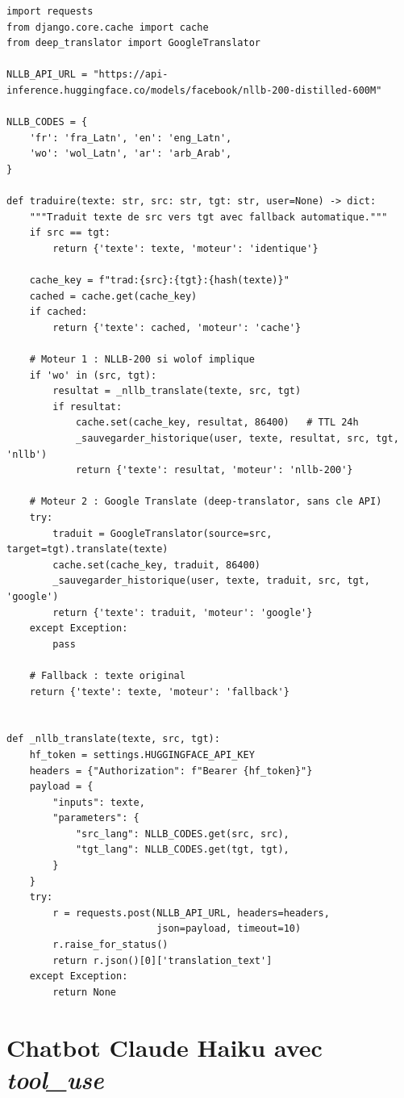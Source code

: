 \documentclass[12pt,a4paper,twoside]{report}
\begin{document}
\begin{lstlisting}[style=pythonstyle, caption={Service de traduction (\texttt{apps/traduction/services.py} --- extrait)}]
import requests
from django.core.cache import cache
from deep_translator import GoogleTranslator

NLLB_API_URL = "https://api-inference.huggingface.co/models/facebook/nllb-200-distilled-600M"

NLLB_CODES = {
    'fr': 'fra_Latn', 'en': 'eng_Latn',
    'wo': 'wol_Latn', 'ar': 'arb_Arab',
}

def traduire(texte: str, src: str, tgt: str, user=None) -> dict:
    """Traduit texte de src vers tgt avec fallback automatique."""
    if src == tgt:
        return {'texte': texte, 'moteur': 'identique'}

    cache_key = f"trad:{src}:{tgt}:{hash(texte)}"
    cached = cache.get(cache_key)
    if cached:
        return {'texte': cached, 'moteur': 'cache'}

    # Moteur 1 : NLLB-200 si wolof implique
    if 'wo' in (src, tgt):
        resultat = _nllb_translate(texte, src, tgt)
        if resultat:
            cache.set(cache_key, resultat, 86400)   # TTL 24h
            _sauvegarder_historique(user, texte, resultat, src, tgt, 'nllb')
            return {'texte': resultat, 'moteur': 'nllb-200'}

    # Moteur 2 : Google Translate (deep-translator, sans cle API)
    try:
        traduit = GoogleTranslator(source=src, target=tgt).translate(texte)
        cache.set(cache_key, traduit, 86400)
        _sauvegarder_historique(user, texte, traduit, src, tgt, 'google')
        return {'texte': traduit, 'moteur': 'google'}
    except Exception:
        pass

    # Fallback : texte original
    return {'texte': texte, 'moteur': 'fallback'}


def _nllb_translate(texte, src, tgt):
    hf_token = settings.HUGGINGFACE_API_KEY
    headers = {"Authorization": f"Bearer {hf_token}"}
    payload = {
        "inputs": texte,
        "parameters": {
            "src_lang": NLLB_CODES.get(src, src),
            "tgt_lang": NLLB_CODES.get(tgt, tgt),
        }
    }
    try:
        r = requests.post(NLLB_API_URL, headers=headers,
                          json=payload, timeout=10)
        r.raise_for_status()
        return r.json()[0]['translation_text']
    except Exception:
        return None
\end{lstlisting}

\section{Chatbot Claude Haiku avec \textit{tool\_use}}
\label{sec:chatbot}
\end{document}
